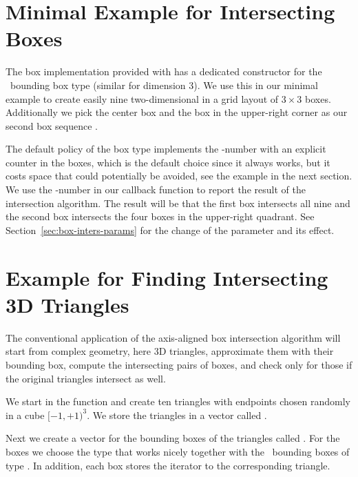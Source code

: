 \section{Minimal Example for Intersecting Boxes}
\label{sec:box-intersect-minimal}

The box implementation provided with
 has a dedicated
constructor for the \cgal\ bounding box type 
(similar for dimension 3). We use this in our minimal example to
create easily nine two-dimensional  in a grid layout of $3
\times 3$ boxes. Additionally we pick the center box and the box in
the upper-right corner as our second box sequence .

The default policy of the box type implements the -number with
an explicit counter in the boxes, which is the default choice since it
always works, but it costs space that could potentially be avoided,
see the example in the next section. We use the -number in our
callback function to report the result of the intersection algorithm.
The result will be that the first  box intersects all nine
 and the second  box intersects the four boxes
in the upper-right quadrant. See Section~\ref{sec:box-inters-params}
for the change of the  parameter and its effect.



\section{Example for Finding Intersecting 3D Triangles}

The conventional application of the axis-aligned box intersection
algorithm will start from complex geometry, here 3D triangles,
approximate them with their bounding box, compute the intersecting
pairs of boxes, and check only for those if the original triangles
intersect as well.

We start in the  function and create ten triangles with
endpoints chosen randomly in a cube $[-1,+1)^3$. We store the
triangles in a vector called .

Next we create a vector for the bounding boxes of the triangles called
. For the boxes we choose the type
 that works nicely together
with the \cgal\ bounding boxes of type . In
addition, each box stores the iterator to the corresponding triangle.

